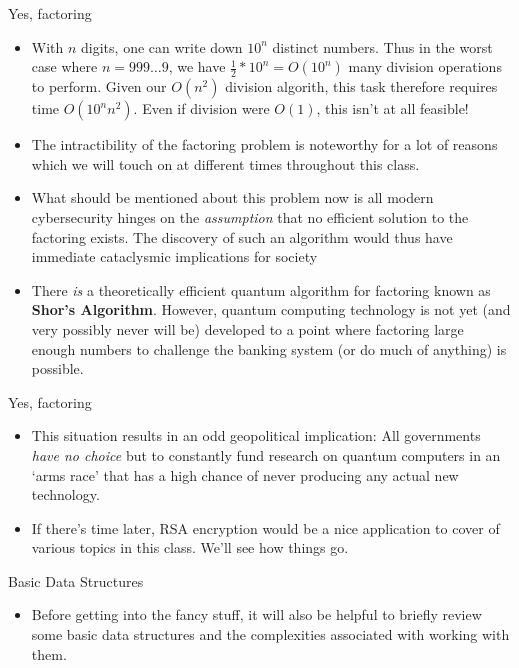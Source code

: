 \documentclass{beamer}
\begin{document}
\begin{frame}{Yes, factoring}
    \begin{itemize}
        \item With $n$ digits, one can write down $10^n$ distinct numbers. Thus in the worst case where $n = 999\ldots9$, we have $\frac{1}{2}*10^n = O(10^n)$ many division operations to perform. Given our $O(n^2)$ division algorith, this task therefore requires time $O(10^n n^2)$. Even if division were $O(1)$, this isn't at all feasible!
        \pause
        \item The intractibility of the factoring problem is noteworthy for a lot of reasons which we will touch on at different times throughout this class. 
        \item What should be mentioned about this problem now is all modern cybersecurity hinges on the \emph{assumption} that no efficient solution to the factoring exists. The discovery of such an algorithm would thus have immediate cataclysmic implications for society 
        \pause
        \item There \emph{is} a theoretically efficient quantum algorithm for factoring known as \textbf{Shor's Algorithm}. However, quantum computing technology is not yet (and very possibly never will be) developed to a point where factoring large enough numbers to challenge the banking system (or do much of anything) is possible.
    \end{itemize}
\end{frame}

\begin{frame}{Yes, factoring}
    \begin{itemize}
        \item This situation results in an odd geopolitical implication: All governments \emph{have no choice} but to constantly fund research on quantum computers in an `arms race' that has a high chance of never producing any actual new technology.
        \item If there's time later, RSA encryption would be a nice application to cover of various topics in this class. We'll see how things go.
    \end{itemize}
\end{frame}

\begin{frame}{Basic Data Structures}
    \begin{itemize}
    \item Before getting into the fancy stuff, it will also be helpful to briefly review some basic data structures and the complexities associated with working with them.
    \end{itemize}
\end{frame}
\end{document}
